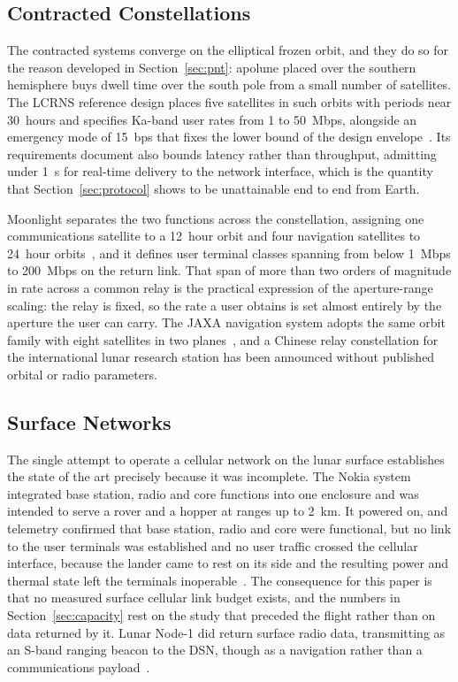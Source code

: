\documentclass[11pt,a4paper]{article}
\begin{document}
\subsection{Contracted Constellations}
The contracted systems converge on the elliptical frozen orbit, and they do so for the reason developed in Section~\ref{sec:pnt}: apolune placed over the southern hemisphere buys dwell time over the south pole from a small number of satellites. The LCRNS reference design places five satellites in such orbits with periods near \SI{30}{hours} and specifies Ka-band user rates from \SI{1}{} to \SI{50}{Mbps}, alongside an emergency mode of \SI{15}{bps} that fixes the lower bound of the design envelope~\cite{lcrns_ref_const,nasa_lunar_relay_srd}. Its requirements document also bounds latency rather than throughput, admitting under \SI{1}{\second} for real-time delivery to the network interface, which is the quantity that Section~\ref{sec:protocol} shows to be unattainable end to end from Earth.

Moonlight separates the two functions across the constellation, assigning one communications satellite to a \SI{12}{hour} orbit and four navigation satellites to \SI{24}{hour} orbits~\cite{esa_moonlight_overview,esa_moonlight_csc}, and it defines user terminal classes spanning from below \SI{1}{Mbps} to \SI{200}{Mbps} on the return link. That span of more than two orders of magnitude in rate across a common relay is the practical expression of the aperture-range scaling: the relay is fixed, so the rate a user obtains is set almost entirely by the aperture the user can carry. The JAXA navigation system adopts the same orbit family with eight satellites in two planes~\cite{jaxa_lnss}, and a Chinese relay constellation for the international lunar research station has been announced without published orbital or radio parameters.

\subsection{Surface Networks}
The single attempt to operate a cellular network on the lunar surface establishes the state of the art precisely because it was incomplete. The Nokia system integrated base station, radio and core functions into one enclosure and was intended to serve a rover and a hopper at ranges up to \SI{2}{km}. It powered on, and telemetry confirmed that base station, radio and core were functional, but no link to the user terminals was established and no user traffic crossed the cellular interface, because the lander came to rest on its side and the resulting power and thermal state left the terminals inoperable~\cite{nokia_im2_outcome}. The consequence for this paper is that no measured surface cellular link budget exists, and the numbers in Section~\ref{sec:capacity} rest on the study that preceded the flight rather than on data returned by it. Lunar Node-1 did return surface radio data, transmitting as an S-band ranging beacon to the DSN, though as a navigation rather than a communications payload~\cite{nasa_ln1}.
\end{document}
